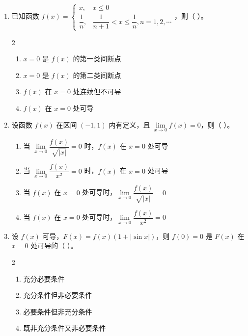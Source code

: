 \begin{enumerate}[label=\textbf{\arabic*.}, itemsep=4.7cm]
    \item 已知函数 $f(x) = \begin{cases} x, & x \le 0 \\ \dfrac{1}{n}, & \dfrac{1}{n+1} < x \le \dfrac{1}{n}, n=1,2,\cdots \end{cases}$，则（ \quad ）。
    \begin{multicols}{2}
        \begin{enumerate}[label=(\Alph*)]
            \item $x=0$ 是 $f(x)$ 的第一类间断点
            \item $x=0$ 是 $f(x)$ 的第二类间断点
            \item $f(x)$ 在 $x=0$ 处连续但不可导
            \item $f(x)$ 在 $x=0$ 处可导
        \end{enumerate}
    \end{multicols}

    \item 设函数 $f(x)$ 在区间 $(-1, 1)$ 内有定义，且 $\lim\limits_{x \to 0} f(x) = 0$，则（ \quad ）。
        \begin{enumerate}[label=(\Alph*)]
            \item 当 $\lim\limits_{x \to 0} \dfrac{f(x)}{\sqrt{|x|}} = 0$ 时，$f(x)$ 在 $x=0$ 处可导
            \item 当 $\lim\limits_{x \to 0} \dfrac{f(x)}{x^2} = 0$ 时，$f(x)$ 在 $x=0$ 处可导
            \item 当 $f(x)$ 在 $x=0$ 处可导时，$\lim\limits_{x \to 0} \dfrac{f(x)}{\sqrt{|x|}} = 0$
            \item 当 $f(x)$ 在 $x=0$ 处可导时，$\lim\limits_{x \to 0} \dfrac{f(x)}{x^2} = 0$
        \end{enumerate}

    \item 设 $f(x)$ 可导，$F(x) = f(x)(1 + |\sin x|)$，则 $f(0)=0$ 是 $F(x)$ 在 $x=0$ 处可导的（ \quad ）。
    \begin{multicols}{2}
        \begin{enumerate}[label=(\Alph*)]
            \item 充分必要条件
            \item 充分条件但非必要条件
            \item 必要条件但非充分条件
            \item 既非充分条件又非必要条件
        \end{enumerate}
    \end{multicols}


\end{enumerate}
